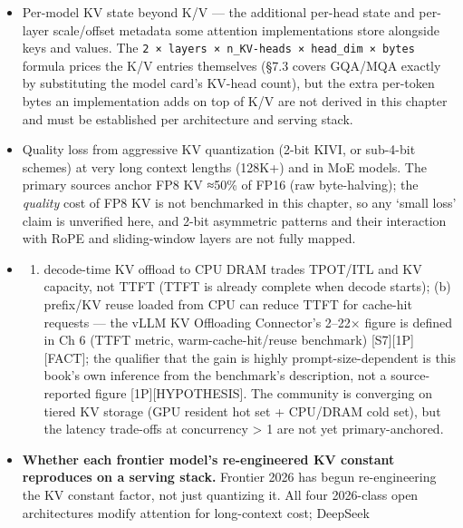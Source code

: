 \begin{itemize}
\item
  Per-model KV state beyond K/V --- the additional per-head state and
  per-layer scale/offset metadata some attention implementations store
  alongside keys and values. The
  \texttt{2\ ×\ layers\ ×\ n\_KV-heads\ ×\ head\_dim\ ×\ bytes} formula
  prices the K/V entries themselves (§7.3 covers GQA/MQA exactly by
  substituting the model card's KV-head count), but the extra per-token
  bytes an implementation adds on top of K/V are not derived in this
  chapter and must be established per architecture and serving stack.
\item
  Quality loss from aggressive KV quantization (2-bit KIVI, or sub-4-bit
  schemes) at very long context lengths (128K+) and in MoE models. The
  primary sources anchor FP8 KV ≈50\% of FP16 (raw byte-halving); the
  \emph{quality} cost of FP8 KV is not benchmarked in this chapter, so
  any `small loss' claim is unverified here, and 2-bit asymmetric
  patterns and their interaction with RoPE and sliding-window layers are
  not fully mapped.
\item
  \begin{enumerate}
  \def\labelenumi{(\alph{enumi})}
  \tightlist
  \item
    decode-time KV offload to CPU DRAM trades TPOT/ITL and KV capacity,
    not TTFT (TTFT is already complete when decode starts); (b)
    prefix/KV reuse loaded from CPU can reduce TTFT for cache-hit
    requests --- the vLLM KV Offloading Connector's 2--22× figure is
    defined in Ch 6 (TTFT metric, warm-cache-hit/reuse benchmark)
    \mbox{{[}S7{]}}\hspace{0pt}\mbox{{[}1P{]}}\hspace{0pt}\mbox{{[}FACT{]}}; the qualifier that the gain is highly
    prompt-size-dependent is this book's own inference from the
    benchmark's description, not a source-reported figure
    \mbox{{[}1P{]}}\hspace{0pt}\mbox{{[}HYPOTHESIS{]}}. The community is converging on tiered KV
    storage (GPU resident hot set + CPU/DRAM cold set), but the latency
    trade-offs at concurrency \textgreater{} 1 are not yet
    primary-anchored.
  \end{enumerate}
\item
  \textbf{Whether each frontier model's re-engineered KV constant
  reproduces on a serving stack.} Frontier 2026 has begun re-engineering
  the KV constant factor, not just quantizing it. All four 2026-class
  open architectures modify attention for long-context cost; DeepSeek

\end{itemize}

